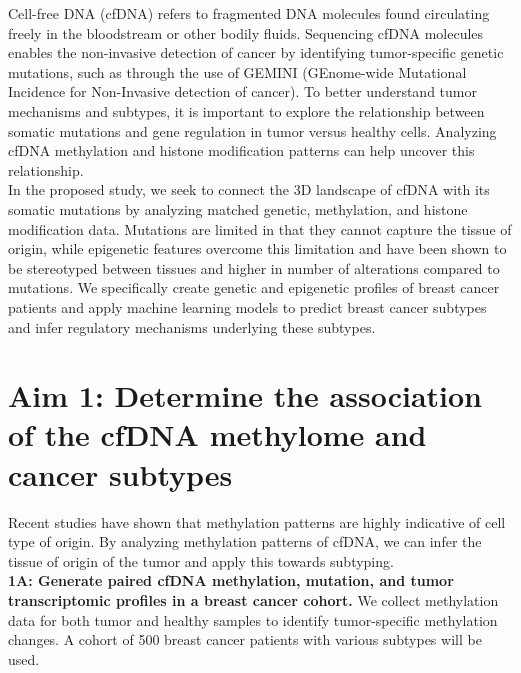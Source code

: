 \documentclass[11pt]{article}
\title{}
\author{}
\date{}
\begin{document}
\vspace{-1cm}

\noindent Cell-free DNA (cfDNA) refers to fragmented DNA molecules found circulating freely in the bloodstream or other bodily fluids. 
Sequencing cfDNA molecules enables the non-invasive detection of cancer by identifying tumor-specific genetic mutations, such as through the use of GEMINI (GEnome-wide Mutational Incidence for Non-Invasive detection of cancer). \cite{bruhm_single-molecule_2023}
To better understand tumor mechanisms and subtypes, it is important to explore the relationship between somatic mutations and gene regulation in tumor versus healthy cells. Analyzing cfDNA methylation and histone modification patterns can help uncover this relationship. \cite{penny_chromatin-_2024, baca_liquid_2023} \\
In the proposed study, we seek to connect the 3D landscape of cfDNA with its somatic mutations by analyzing matched genetic, methylation, and histone modification data. 
Mutations are limited in that they cannot capture the tissue of origin, while epigenetic features overcome this limitation and have been shown to be stereotyped between tissues and higher in number of alterations compared to mutations. \cite{penny_chromatin-_2024, bie_multimodal_2023, cisneros-villanueva_cell-free_2022}
We specifically create genetic and epigenetic profiles of breast cancer patients and apply machine learning models to predict breast cancer subtypes and infer regulatory mechanisms underlying these subtypes.
\section*{Aim 1: Determine the association of the cfDNA methylome and cancer subtypes}
Recent studies have shown that methylation patterns are highly indicative of cell type of origin.\cite{spector_methylome_2023} 
By analyzing methylation patterns of cfDNA, we can infer the tissue of origin of the tumor and apply this towards subtyping.
\medskip \\
\noindent \textbf{1A: Generate paired cfDNA methylation, mutation, and tumor transcriptomic profiles in a breast cancer cohort.} We collect methylation data for both tumor and healthy samples to identify tumor-specific methylation changes. A cohort of 500 breast cancer patients with various subtypes will be used. 
\end{document}
